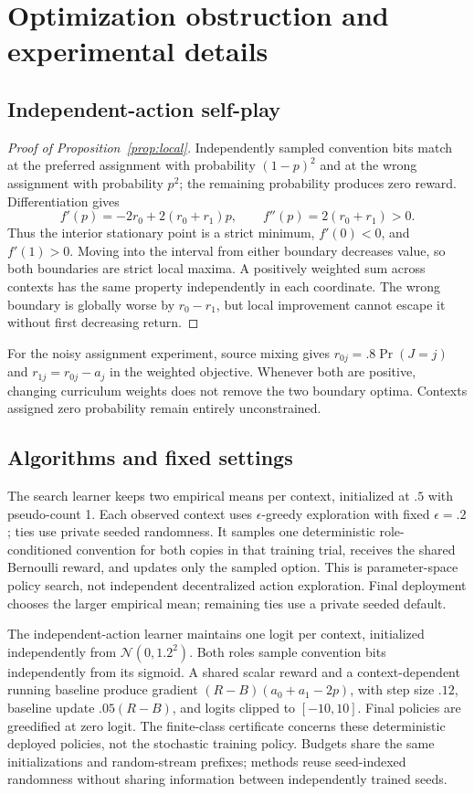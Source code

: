 \documentclass[11pt]{article}
\theoremstyle{definition}\newtheorem{definition}[theorem]{Definition}
\newcommand{\1}{\mathbf{1}}
\begin{document}
\section{Optimization obstruction and experimental details}\label{app:reproduction}
\subsection{Independent-action self-play}
\begin{proof}[Proof of Proposition~\ref{prop:local}]
Independently sampled convention bits match at the preferred assignment with probability $(1-p)^2$ and at the wrong assignment with probability $p^2$; the remaining probability produces zero reward. Differentiation gives
\begin{equation*}
 f'(p)=-2r_0+2(r_0+r_1)p,\qquad f''(p)=2(r_0+r_1)>0.
\end{equation*}
Thus the interior stationary point is a strict minimum, $f'(0)<0$, and $f'(1)>0$. Moving into the interval from either boundary decreases value, so both boundaries are strict local maxima. A positively weighted sum across contexts has the same property independently in each coordinate. The wrong boundary is globally worse by $r_0-r_1$, but local improvement cannot escape it without first decreasing return.
\end{proof}
For the noisy assignment experiment, source mixing gives $r_{0j}=.8\Pr(J=j)$ and $r_{1j}=r_{0j}-a_j$ in the weighted objective. Whenever both are positive, changing curriculum weights does not remove the two boundary optima. Contexts assigned zero probability remain entirely unconstrained.

\subsection{Algorithms and fixed settings}
The search learner keeps two empirical means per context, initialized at $.5$ with pseudo-count 1. Each observed context uses $\epsilon$-greedy exploration with fixed $\epsilon=.2$; ties use private seeded randomness. It samples one deterministic role-conditioned convention for both copies in that training trial, receives the shared Bernoulli reward, and updates only the sampled option. This is parameter-space policy search, not independent decentralized action exploration. Final deployment chooses the larger empirical mean; remaining ties use a private seeded default.

The independent-action learner maintains one logit per context, initialized independently from $\mathcal N(0,1.2^2)$. Both roles sample convention bits independently from its sigmoid. A shared scalar reward and a context-dependent running baseline produce gradient $(R-B)(a_0+a_1-2p)$, with step size $.12$, baseline update $.05(R-B)$, and logits clipped to $[-10,10]$. Final policies are greedified at zero logit. The finite-class certificate concerns these deterministic deployed policies, not the stochastic training policy. Budgets share the same initializations and random-stream prefixes; methods reuse seed-indexed randomness without sharing information between independently trained seeds.
\end{document}
